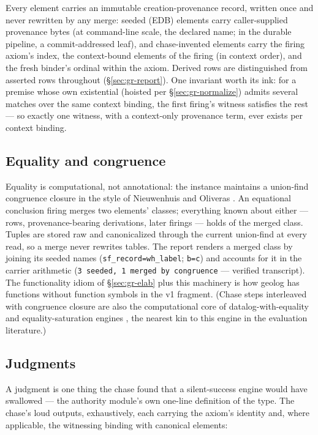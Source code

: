 Every element carries an immutable creation-provenance record,
written once and never rewritten by any merge: seeded (EDB) elements
carry caller-supplied provenance bytes (at command-line scale, the
declared name; in the durable pipeline, a commit-addressed leaf), and
chase-invented elements carry the firing axiom's index, the
context-bound elements of the firing (in context order), and the
fresh binder's ordinal within the axiom. Derived rows are
distinguished from asserted rows throughout
(\S\ref{sec:gr-report}). One invariant worth its ink: for a premise
whose own existential (hoisted per \S\ref{sec:gr-normalize}) admits
several matches over the same context binding, the first firing's
witness satisfies the rest — so exactly one witness, with a
context-only provenance term, ever exists per context binding.

\subsection{Equality and congruence}
\label{sec:gr-chase-congruence}

Equality is computational, not annotational: the instance maintains a
union-find congruence closure in the style of Nieuwenhuis and
Oliveras \cite{nieuwenhuisoliveras2007}. An
equational conclusion firing merges two elements' classes; everything
known about either — rows, provenance-bearing derivations, later
firings — holds of the merged class. Tuples are stored raw and
canonicalized through the current union-find at every read, so a
merge never rewrites tables. The report renders a merged class by
joining its seeded names (\texttt{sf\_record=wh\_label};
\texttt{b=c}) and accounts for it in the carrier arithmetic
(\texttt{3 seeded, 1 merged by congruence} — verified transcript).
The functionality idiom of \S\ref{sec:gr-elab} plus this machinery is
how geolog has functions without function symbols in the v1
fragment. (Chase steps interleaved with congruence closure are also
the computational core of datalog-with-equality and
equality-saturation engines \cite{bidlingmaier23,zhang23}, the
nearest kin to this engine in the evaluation literature.)

\subsection{Judgments}
\label{sec:gr-chase-judgments}

A judgment is one thing the chase found that a silent-success engine
would have swallowed — the authority module's own one-line definition
of the type. The chase's loud outputs, exhaustively, each carrying
the axiom's identity and, where applicable, the witnessing binding
with canonical elements:

